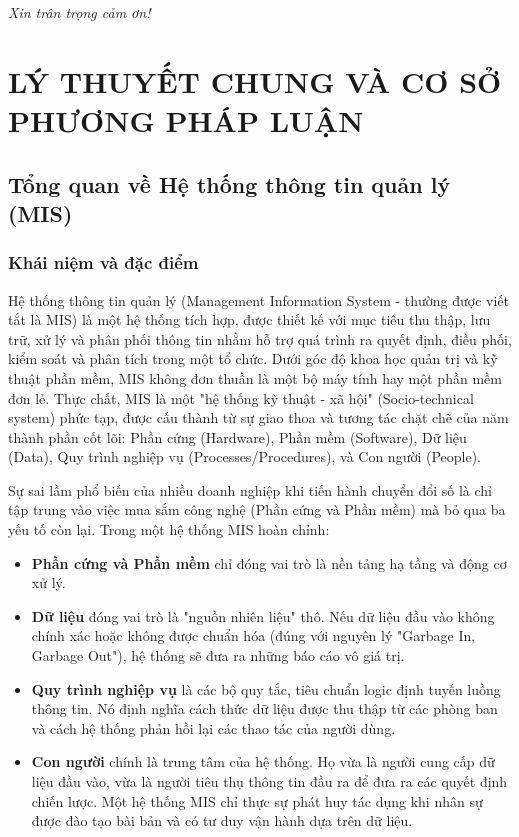 \documentclass[a4paper,13.5pt]{extreport}
\begin{document}
\vspace{1cm}
\begin{flushright}
    \textit{Xin trân trọng cảm ơn!}
\end{flushright}

\chapter{LÝ THUYẾT CHUNG VÀ CƠ SỞ PHƯƠNG PHÁP LUẬN}

\section{Tổng quan về Hệ thống thông tin quản lý (MIS)}

\subsection{Khái niệm và đặc điểm}
Hệ thống thông tin quản lý (Management Information System - thường được viết tắt là MIS) là một hệ thống tích hợp, được thiết kế với mục tiêu thu thập, lưu trữ, xử lý và phân phối thông tin nhằm hỗ trợ quá trình ra quyết định, điều phối, kiểm soát và phân tích trong một tổ chức. Dưới góc độ khoa học quản trị và kỹ thuật phần mềm, MIS không đơn thuần là một bộ máy tính hay một phần mềm đơn lẻ. Thực chất, MIS là một "hệ thống kỹ thuật - xã hội" (Socio-technical system) phức tạp, được cấu thành từ sự giao thoa và tương tác chặt chẽ của năm thành phần cốt lõi: Phần cứng (Hardware), Phần mềm (Software), Dữ liệu (Data), Quy trình nghiệp vụ (Processes/Procedures), và Con người (People). 

Sự sai lầm phổ biến của nhiều doanh nghiệp khi tiến hành chuyển đổi số là chỉ tập trung vào việc mua sắm công nghệ (Phần cứng và Phần mềm) mà bỏ qua ba yếu tố còn lại. Trong một hệ thống MIS hoàn chỉnh:
\begin{itemize}
    \item \textbf{Phần cứng và Phần mềm} chỉ đóng vai trò là nền tảng hạ tầng và động cơ xử lý.
    \item \textbf{Dữ liệu} đóng vai trò là "nguồn nhiên liệu" thô. Nếu dữ liệu đầu vào không chính xác hoặc không được chuẩn hóa (đúng với nguyên lý "Garbage In, Garbage Out"), hệ thống sẽ đưa ra những báo cáo vô giá trị.
    \item \textbf{Quy trình nghiệp vụ} là các bộ quy tắc, tiêu chuẩn logic định tuyến luồng thông tin. Nó định nghĩa cách thức dữ liệu được thu thập từ các phòng ban và cách hệ thống phản hồi lại các thao tác của người dùng.
    \item \textbf{Con người} chính là trung tâm của hệ thống. Họ vừa là người cung cấp dữ liệu đầu vào, vừa là người tiêu thụ thông tin đầu ra để đưa ra các quyết định chiến lược. Một hệ thống MIS chỉ thực sự phát huy tác dụng khi nhân sự được đào tạo bài bản và có tư duy vận hành dựa trên dữ liệu.
\end{itemize}
\end{document}
